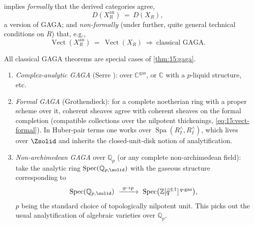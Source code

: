 \begin{remark}
\label{rmk:15:gaga-consequences}
 implies \emph{formally} that the derived categories agree,
\begin{equation*}
D(X_R^{\mathrm{an}})\ =\ D(X_R),
\end{equation*}
a version of GAGA; and \emph{non-formally} (under further, quite general technical
conditions on $R$) that, e.g.,
\begin{equation*}
\operatorname{Vect}(X_R^{\mathrm{an}})\ =\ \operatorname{Vect}(X_R)
\ \Longrightarrow\ \text{classical GAGA.}
\end{equation*}
\end{remark}

\begin{remark}
\label{rmk:15:gaga-special}
All classical GAGA theorems are special cases of \cref{thm:15:gaga}.
\begin{enumerate}
\item \emph{Complex-analytic GAGA} (Serre \cite{Serre_1956}): over
$\mathbb{C}^{\mathrm{gas}}$, or $\mathbb{C}$ with a $p$-liquid structure, etc.
\item \emph{Formal GAGA} (Grothendieck): for a complete noetherian ring with a proper
scheme over it, coherent sheaves agree with coherent sheaves on the formal completion
(compatible collections over the nilpotent thickenings, \eqref{eq:15:vect-formal}).
In Huber-pair terms one works over $\operatorname{Spa}(R^{\wedge}_I, R^{\wedge}_I)$,
which lives over $\Zsolid$ and inherits the closed-unit-disk notion of
analytification.
\item \emph{Non-archimedean GAGA} over $\mathbb{Q}_p$ (or any complete
non-archimedean field): take the analytic ring $\operatorname{Spec}(\mathbb{Q}_{p,\solid})$
with the gaseous structure corresponding to
\begin{equation}
\label{eq:15:nonarch-gaga}
\operatorname{Spec}(\mathbb{Q}_{p,\solid})\ \xrightarrow{\ q\mapsto p\ }\
\operatorname{Spec}\bigl(\mathbb{Z}[\widehat q^{\pm1}]^{\,q\text{-}\mathrm{gas}}\bigr),
\end{equation}
$p$ being the standard choice of topologically nilpotent unit. This picks out the
usual analytification of algebraic varieties over $\mathbb{Q}_p$.
\end{enumerate}
\end{remark}

